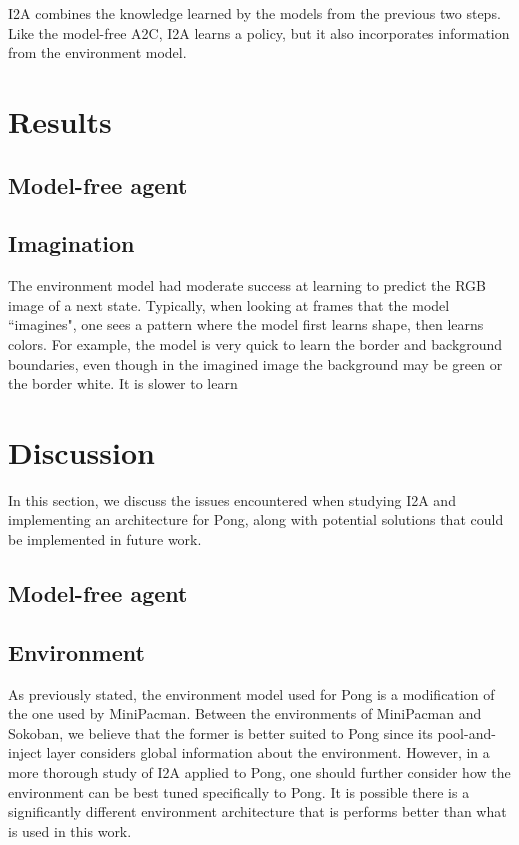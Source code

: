 \documentclass[10pt, twocolumn]{article}
\begin{document}
I2A combines the knowledge learned by the models from the previous two steps. Like the model-free A2C, I2A learns a policy, but it also incorporates information from the environment model.

\section{Results}

\subsection{Model-free agent}

\subsection{Imagination}

The environment model had moderate success at learning to predict the RGB image of a next state. Typically, when looking at frames
that the model ``imagines", one sees a pattern where the model first learns shape, then learns colors. For example, the model is very quick to learn the border and background boundaries, even though in the imagined image the background may be green or the border white. It is slower to learn 

\section{Discussion}

In this section, we discuss the issues encountered when studying I2A and implementing an architecture for Pong, along with potential solutions that could be implemented in future work.

\subsection{Model-free agent}

\subsection{Environment}
As previously stated, the environment model used for Pong is a modification of the one used by MiniPacman. Between the environments of MiniPacman and Sokoban, we believe that the former is better suited to Pong since its pool-and-inject layer considers global information about the environment. However, in a more thorough study of I2A applied to Pong, one should further consider how the environment can be best tuned specifically to Pong. It is possible there is a significantly different environment architecture that is performs better than what is used in this work.
\end{document}
